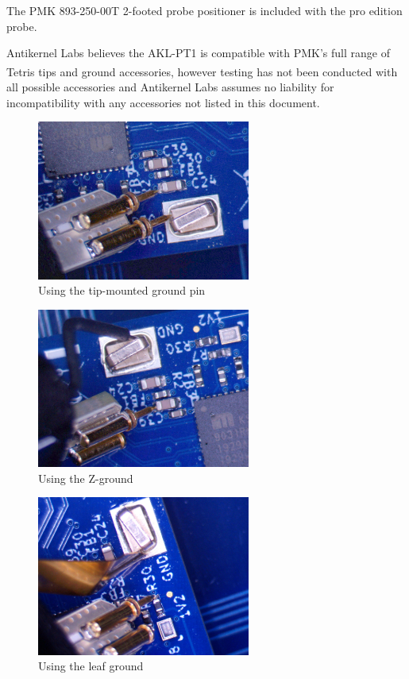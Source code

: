 \documentclass[11pt]{article}
\begin{document}
The PMK 893-250-00T 2-footed probe positioner is included with the pro edition probe.

Antikernel Labs believes the AKL-PT1 is compatible with PMK's full range of Tetris\textsuperscript{\textregistered}
tips and ground accessories, however testing has not been conducted with all possible accessories and Antikernel Labs
assumes no liability for incompatibility with any accessories not listed in this document.

\begin{figure}[h!]
\centering
\includegraphics[width=7cm]{tip-ground-01.jpg}
\caption{Using the tip-mounted ground pin}
\end{figure}

\begin{figure}[h!]
\centering
\includegraphics[width=7cm]{zground-usage.jpg}
\caption{Using the Z-ground}
\end{figure}

\begin{figure}[h!]
\centering
\includegraphics[width=7cm]{leafground-usage.jpg}
\caption{Using the leaf ground}
\end{figure}
\end{document}

